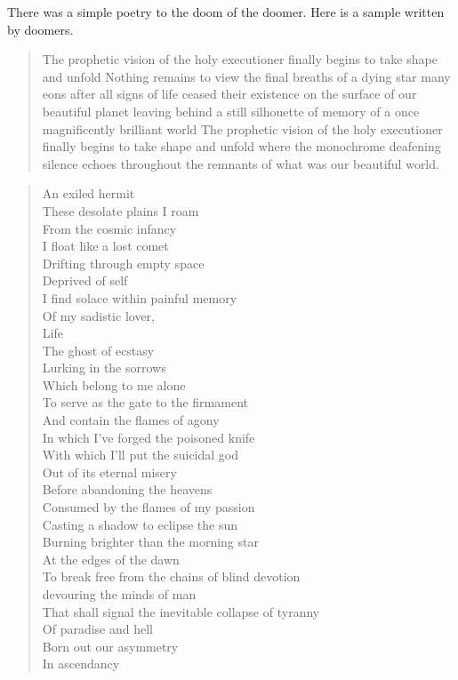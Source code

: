 \documentclass[../report.tex]{subfiles}
\begin{document}
There was a simple poetry to the doom of the doomer. Here is a sample written by doomers.

\begin{quotation}
    The prophetic vision of the holy executioner finally begins to take shape and unfold
    Nothing remains to view the final breaths of a dying star many eons after all signs
    of life ceased their existence on the surface of our beautiful planet
    leaving behind a still silhouette of memory of a once magnificently brilliant world
    The prophetic vision of the holy executioner finally begins to take shape and unfold where the monochrome deafening silence echoes throughout the remnants of what was our beautiful world.
\end{quotation}

\begin{quotation}
	\noindent
	An exiled hermit\\
	These desolate plains I roam\\
	From the cosmic infancy\\
	I float like a lost comet\\
	Drifting through empty space\\
	Deprived of self\\
	I find solace within painful memory\\
	Of my sadistic lover,\\
	Life\\
	The ghost of ecstasy\\
	Lurking in the sorrows\\
	Which belong to me alone\\
	To serve as the gate to the firmament\\
	And contain the flames of agony\\
	In which I've forged the poisoned knife\\
	With which I'll put the suicidal god\\
	Out of its eternal misery\\
	Before abandoning the heavens\\
	Consumed by the flames of my passion\\
	Casting a shadow to eclipse the sun\\
	Burning brighter than the morning star\\
	At the edges of the dawn\\
	To break free from the chains of blind devotion\\
	devouring the minds of man\\
	That shall signal the inevitable collapse of tyranny\\
	Of paradise and hell\\
	Born out our asymmetry\\
	In ascendancy\\
\end{quotation}
\end{document}
